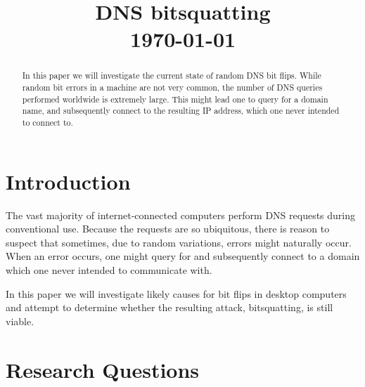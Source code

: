 \documentclass[conference]{IEEEtran}
\begin{document}
\title{DNS bitsquatting\\\vspace{5mm} \large  \today}
\author{
\and
{}
}
\maketitle
\thispagestyle{plain}
\pagestyle{plain}

\begin{abstract}

	In this paper we will investigate the current state of random DNS bit flips.
	While random bit errors in a machine are not very common, the number of DNS
	queries performed worldwide is extremely large. This might lead one to query
	for a domain name, and subsequently connect to the resulting IP address, which
	one never intended to connect to.

\end{abstract}

\section{Introduction}

The vast majority of internet-connected computers perform DNS requests during
conventional use. Because the requests are so ubiquitous, there is reason to
suspect that sometimes, due to random variations, errors might naturally occur.
When an error occurs, one might query for and subsequently connect to a domain
which one never intended to communicate with.

In this paper we will investigate likely causes for bit flips in desktop
computers and attempt to determine whether the resulting attack, bitsquatting,
is still viable.



\section{Research Questions}\label{sec:researchq}
\end{document}
